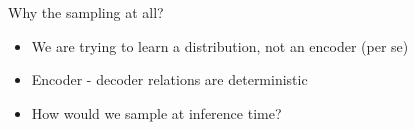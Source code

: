 \documentclass[10pt,aspectratio=169]{beamer}
\begin{document}
\begin{frame}{Why the sampling at all?}
    \begin{itemize}[<+->]
        \item We are trying to learn a distribution, not an encoder (per se)
        \item Encoder - decoder relations are deterministic
        \item How would we sample at inference time?
    \end{itemize}
    \begin{center}
    \end{center}
\end{frame}
\end{document}
